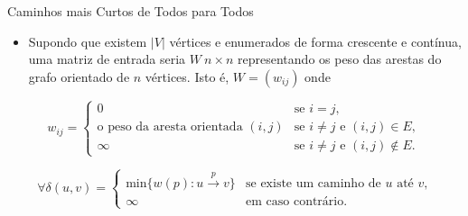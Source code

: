 \documentclass[aspectratio=169]{beamer}
\begin{document}
	
	\begin{frame}{Caminhos mais Curtos de Todos para Todos}
		\begin{itemize}
			\item Supondo que existem $|V|$ vértices e enumerados de forma crescente e contínua, uma matriz de entrada seria $W\ n \times n$ representando os peso das arestas do grafo orientado de $n$ vértices. Isto é, $W = (w_{ij})$ onde 
		\end{itemize}
		
		$$
		w_{ij} = 
		\begin{cases}
		0 & \mbox{se } i = j, \\
		\mbox{o peso da aresta orientada } (i, j) & \mbox{se } i \neq j \mbox{ e } (i, j) \in E, \\
		\infty & \mbox{se } i \neq j \mbox{ e } (i, j) \notin E.
		\end{cases}
		$$
		
		\bigskip
		
		$$
		\forall\delta(u, v) = 
		\begin{cases}
		\text{min}\{w(p):u\xrightarrow{p} v\} & \text{se existe um caminho de } u \text{ até } v\text{,}\\
		\infty & \text{em caso contrário.}
		\end{cases}
		$$
		
	\end{frame}
\end{document}
